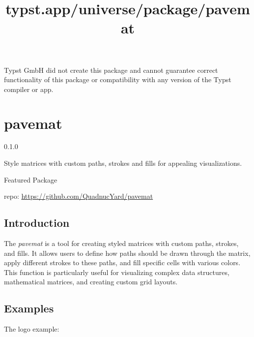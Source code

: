 Typst GmbH did not create this package and cannot guarantee correct
functionality of this package or compatibility with any version of the
Typst compiler or app.


\title{typst.app/universe/package/pavemat}

\label{banner}
\section{pavemat}\label{pavemat}

{ 0.1.0 }

Style matrices with custom paths, strokes and fills for appealing
visualizations.

{ } Featured Package

\label{readme}
\pandocbounded{}

repo: \url{https://github.com/QuadnucYard/pavemat}

\subsection{Introduction}\label{introduction}

The \emph{pavemat} is a tool for creating styled matrices with custom
paths, strokes, and fills. It allows users to define how paths should be
drawn through the matrix, apply different strokes to these paths, and
fill specific cells with various colors. This function is particularly
useful for visualizing complex data structures, mathematical matrices,
and creating custom grid layouts.

\subsection{Examples}\label{examples}

The logo example:

\begin{Shaded}
\begin{Highlighting}[]
\NormalTok{\#\{}

\NormalTok{      "SDS(dash: \textquotesingle{}solid\textquotesingle{})DDD]WW",}
\NormalTok{    ),}
\NormalTok{    ),}
\NormalTok{    delim: "[",}
\NormalTok{  )[$mat(P, a, v, e; "", m, a, t)$]}
\NormalTok{\}}
\end{Highlighting}
\end{Shaded}

